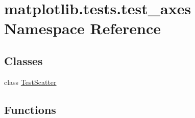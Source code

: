 \hypertarget{namespacematplotlib_1_1tests_1_1test__axes}{}\section{matplotlib.\+tests.\+test\+\_\+axes Namespace Reference}
\label{namespacematplotlib_1_1tests_1_1test__axes}
\subsection*{Classes}
\begin{DoxyCompactItemize}
\item 
class \hyperlink{classmatplotlib_1_1tests_1_1test__axes_1_1TestScatter}{Test\+Scatter}
\end{DoxyCompactItemize}
\subsection*{Functions}
